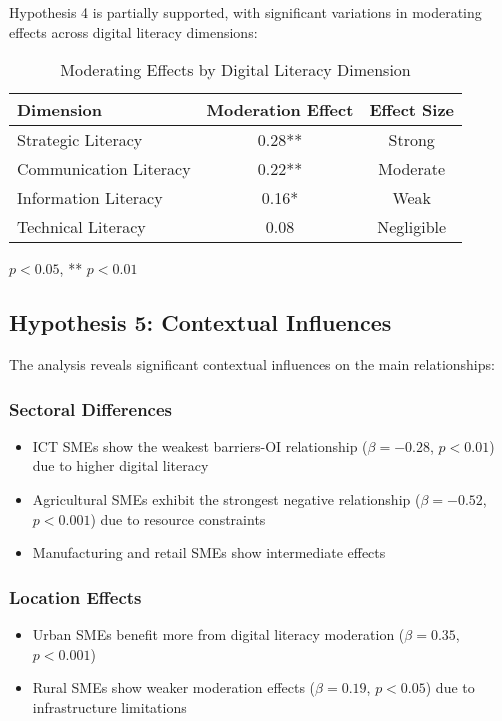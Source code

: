Hypothesis 4 is partially supported, with significant variations in moderating effects across digital literacy dimensions:

\begin{table}[H]
\centering
\caption{Moderating Effects by Digital Literacy Dimension}
\label{tab:dl_moderation}
\begin{tabular}{@{}lcc@{}}
\toprule
\textbf{Dimension} & \textbf{Moderation Effect} & \textbf{Effect Size} \\
\midrule
Strategic Literacy & 0.28** & Strong \\
Communication Literacy & 0.22** & Moderate \\
Information Literacy & 0.16* & Weak \\
Technical Literacy & 0.08 & Negligible \\
\bottomrule
\end{tabular}
\begin{tablenotes}
\item * $p < 0.05$, ** $p < 0.01$
\end{tablenotes}
\end{table}

\subsection{Hypothesis 5: Contextual Influences}

The analysis reveals significant contextual influences on the main relationships:

\subsubsection{Sectoral Differences}
\begin{itemize}
    \item ICT SMEs show the weakest barriers-OI relationship ($\beta = -0.28$, $p < 0.01$) due to higher digital literacy
    \item Agricultural SMEs exhibit the strongest negative relationship ($\beta = -0.52$, $p < 0.001$) due to resource constraints
    \item Manufacturing and retail SMEs show intermediate effects
\end{itemize}

\subsubsection{Location Effects}
\begin{itemize}
    \item Urban SMEs benefit more from digital literacy moderation ($\beta = 0.35$, $p < 0.001$)
    \item Rural SMEs show weaker moderation effects ($\beta = 0.19$, $p < 0.05$) due to infrastructure limitations
\end{itemize}

